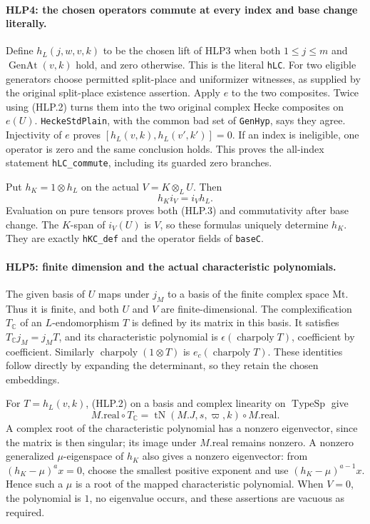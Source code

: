 \paragraph{HLP4: the chosen operators commute at every index and base change literally.}
\label{claim:HLP4}
Define \(h_L(j,w,v,k)\) to be the chosen lift of HLP3 when both
\(1\le j\le m\) and \(\operatorname{GenAt}(v,k)\) hold, and zero
otherwise. This is the literal \texttt{hLC}. For two eligible
generators choose permitted split-place and uniformizer witnesses,
as supplied by the original split-place existence assertion.
Apply \(e\) to the two composites. Twice using (HLP.2) turns them
into the two original complex Hecke composites on \(e(U)\).
\texttt{HeckeStdPlain}, with the common bad set of
\texttt{GenHyp}, says they agree. Injectivity of \(e\) proves
\([h_L(v,k),h_L(v',k')]=0\). If an index is ineligible, one operator
is zero and the same conclusion holds. This proves the all-index
statement \texttt{hLC\_commute}, including its guarded zero branches.

Put \(h_K=1\otimes h_L\) on the actual \(V=K\otimes_LU\). Then
\[
       h_K i_V=i_Vh_L.                              \tag{HLP.3}
\]
Evaluation on pure tensors proves both (HLP.3) and commutativity
after base change. The \(K\)-span of \(i_V(U)\) is \(V\), so these
formulas uniquely determine \(h_K\). They are exactly
\texttt{hKC\_def} and the operator fields of \texttt{baseC}.

\paragraph{HLP5: finite dimension and the actual characteristic polynomials.}
\label{claim:HLP5}
The given basis of \(U\) maps under \(j_M\) to a basis of the finite
complex space \(\mathrm{Mt}\). Thus it is finite, and both \(U\) and
\(V\) are finite-dimensional. The complexification \(T_{\mathbb C}\)
of an \(L\)-endomorphism \(T\) is defined by its matrix in this basis.
It satisfies \(T_{\mathbb C}j_M=j_MT\), and its characteristic
polynomial is \(\epsilon(\operatorname{charpoly}T)\), coefficient by
coefficient. Similarly \(\operatorname{charpoly}(1\otimes T)\) is
\(e_c(\operatorname{charpoly}T)\). These identities follow directly
by expanding the determinant, so they retain the chosen embeddings.

For \(T=h_L(v,k)\), (HLP.2) on a basis and complex linearity on
\(\operatorname{TypeSp}\) give
\[
 M.\mathrm{real}\circ T_{\mathbb C}
   =\operatorname{tN}(M.J,s,\varpi,k)\circ M.\mathrm{real}. \tag{HLP.4}
\]
A complex root of the characteristic polynomial has a nonzero
eigenvector, since the matrix is then singular; its image under
\(M.\mathrm{real}\) remains nonzero. A nonzero generalized
\(\mu\)-eigenspace of \(h_K\) also gives a nonzero eigenvector: from
\((h_K-\mu)^a x=0\), choose the smallest positive exponent and use
\((h_K-\mu)^{a-1}x\). Hence such a \(\mu\) is a root of the mapped
characteristic polynomial. When \(V=0\), the polynomial is \(1\),
no eigenvalue occurs, and these assertions are vacuous as required.


